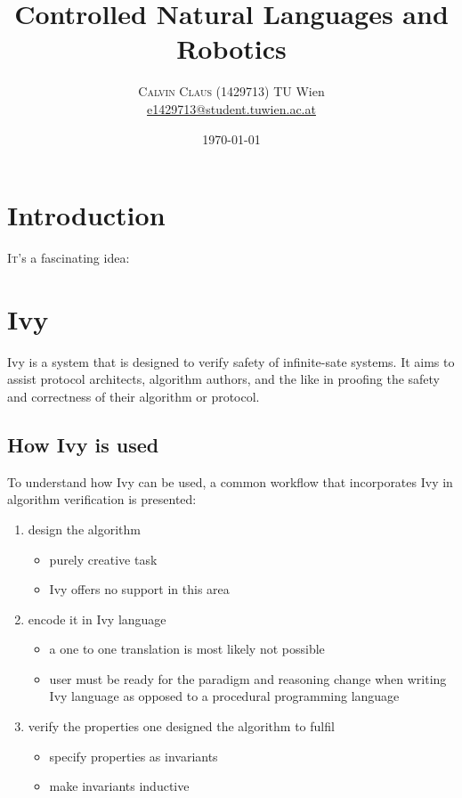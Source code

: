 \documentclass[fleqn]{article}
\title{Controlled Natural Languages and Robotics} %
\author{%
  \textsc{Calvin Claus (1429713)}
  \normalsize TU Wien\\ %
  \normalsize \href{mailto:e1429713@student.tuwien.ac.at}{e1429713@student.tuwien.ac.at} %
}
\date{\today} %
\begin{document}
\maketitle


\section{Introduction}

\lettrine[nindent=0em,lines=3]{I} t's a fascinating idea:

\section{Ivy}
Ivy is a system that is designed to verify safety of infinite-sate systems.
It aims to assist protocol architects, algorithm authors, and the like in proofing the safety and correctness of their algorithm or protocol.

\subsection{How Ivy is used}

To understand how Ivy can be used, a common workflow that incorporates Ivy in algorithm verification is presented:

\begin{enumerate}
  \item design the algorithm
    \begin{itemize}
      \item purely creative task
      \item Ivy offers no support in this area
    \end{itemize}
  \item encode it in Ivy language
    \begin{itemize}
      \item a one to one translation is most likely not possible
      \item user must be ready for the paradigm and reasoning change when writing Ivy language as opposed to a procedural programming language
    \end{itemize}
  \item verify the properties one designed the algorithm to fulfil
    \begin{itemize}
      \item specify properties as invariants
      \item make invariants inductive
    \end{itemize}
\end{enumerate}
\end{document}

